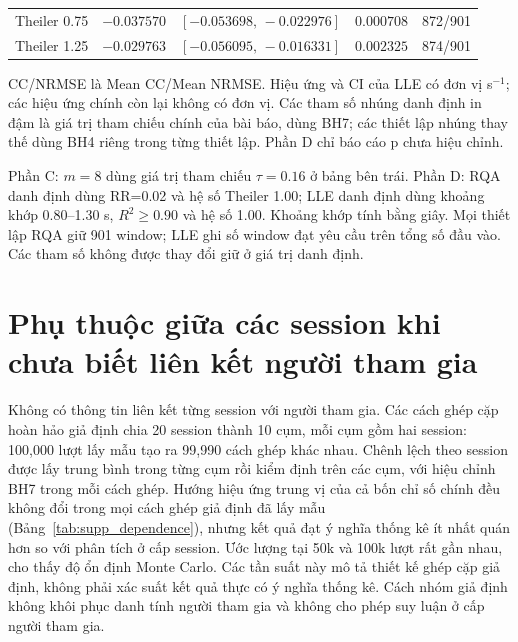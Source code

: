 \documentclass[conference,a4paper]{IEEEtran}
\begin{document}
\begin{table}[!t]
\begin{minipage}[t]{0.49\textwidth}
\begin{tabular*}{\linewidth}{@{\extracolsep{\fill}}lrcrr@{}}
Theiler 0.75 & $-0.037570$ & $[-0.053698,\,-0.022976]$ & $0.000708$ & 872/901\\
Theiler 1.25 & $-0.029763$ & $[-0.056095,\,-0.016331]$ & $0.002325$ & 874/901\\
\bottomrule
\end{tabular*}
\end{minipage}
\par\smallskip
\raggedright CC/NRMSE là Mean CC/Mean NRMSE. Hiệu ứng và CI của LLE có đơn vị s$^{-1}$; các hiệu ứng chính còn lại không có đơn vị. Các tham số nhúng danh định in đậm là giá trị tham chiếu chính của bài báo, dùng BH7; các thiết lập nhúng thay thế dùng BH4 riêng trong từng thiết lập. Phần D chỉ báo cáo p chưa hiệu chỉnh.
\par\smallskip
\raggedright Phần C: $m=8$ dùng giá trị tham chiếu $\tau=0.16$ ở bảng bên trái. Phần D: RQA danh định dùng RR=0.02 và hệ số Theiler 1.00; LLE danh định dùng khoảng khớp 0.80--1.30 s, $R^2\geq0.90$ và hệ số 1.00. Khoảng khớp tính bằng giây. Mọi thiết lập RQA giữ 901 window; LLE ghi số window đạt yêu cầu trên tổng số đầu vào. Các tham số không được thay đổi giữ ở giá trị danh định.
\end{table}
\FloatBarrier
\section{Phụ thuộc giữa các session khi chưa biết liên kết người tham gia}\label{sec:supp_7}
Không có thông tin liên kết từng session với người tham gia. Các cách ghép cặp hoàn hảo giả định chia 20 session thành 10 cụm, mỗi cụm gồm hai session: 100,000 lượt lấy mẫu tạo ra 99,990 cách ghép khác nhau. Chênh lệch theo session được lấy trung bình trong từng cụm rồi kiểm định trên các cụm, với hiệu chỉnh BH7 trong mỗi cách ghép. Hướng hiệu ứng trung vị của cả bốn chỉ số chính đều không đổi trong mọi cách ghép giả định đã lấy mẫu (Bảng~\ref{tab:supp_dependence}), nhưng kết quả đạt ý nghĩa thống kê ít nhất quán hơn so với phân tích ở cấp session. Ước lượng tại 50k và 100k lượt rất gần nhau, cho thấy độ ổn định Monte Carlo. Các tần suất này mô tả thiết kế ghép cặp giả định, không phải xác suất kết quả thực có ý nghĩa thống kê. Cách nhóm giả định không khôi phục danh tính người tham gia và không cho phép suy luận ở cấp người tham gia.
\end{document}
